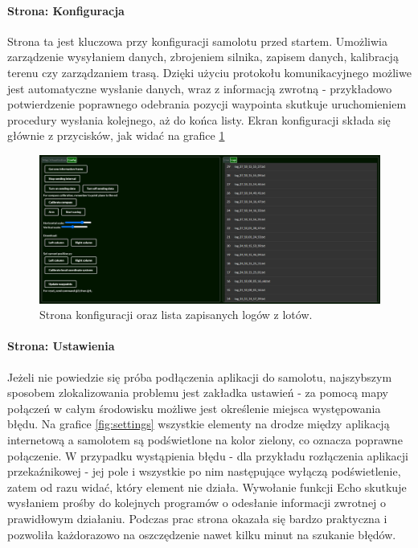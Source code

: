\documentclass[12pt, a4paper]{article}
\begin{document}
\paragraph{Strona: Konfiguracja}\mbox{}

Strona ta jest kluczowa przy konfiguracji samolotu przed startem. Umożliwia zarządzenie wysyłaniem danych, zbrojeniem silnika, zapisem danych, kalibracją terenu czy zarządzaniem trasą. Dzięki użyciu protokołu komunikacyjnego możliwe jest automatyczne wysłanie danych, wraz z informacją zwrotną - przykładowo potwierdzenie poprawnego odebrania pozycji waypointa skutkuje uruchomieniem procedury wysłania kolejnego, aż do końca listy. Ekran konfiguracji składa się głównie z przycisków, jak widać na grafice \ref{fig:konlog}

 \begin{figure}[H]
    \centering
    \includegraphics[width=1\textwidth]{config}
    \caption{Strona konfiguracji oraz lista zapisanych logów z lotów.}
    \label{fig:konlog}
\end{figure}

\paragraph{Strona: Ustawienia}\mbox{}

Jeżeli nie powiedzie się próba podłączenia aplikacji do samolotu, najszybszym sposobem zlokalizowania problemu jest zakładka ustawień - za pomocą mapy połączeń w całym środowisku możliwe jest określenie miejsca występowania błędu. Na grafice \ref{fig:settings} wszystkie elementy na drodze między aplikacją internetową a samolotem są podświetlone na kolor zielony, co oznacza poprawne połączenie. W przypadku wystąpienia błędu - dla przykładu rozłączenia aplikacji przekaźnikowej - jej pole i wszystkie po nim następujące wyłączą podświetlenie, zatem od razu widać, który element nie działa. Wywołanie funkcji Echo skutkuje wysłaniem prośby do kolejnych programów o odesłanie informacji zwrotnej o prawidłowym działaniu. Podczas prac strona okazała się bardzo praktyczna i pozwoliła każdorazowo na oszczędzenie nawet kilku minut na szukanie błędów. 
\end{document}

